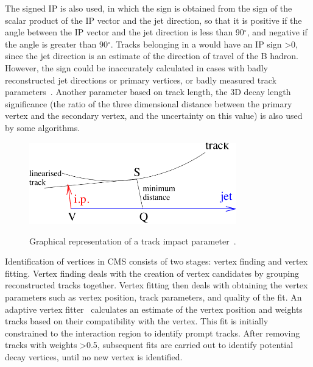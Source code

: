 The signed IP is also used, in which the sign is obtained from the sign of the scalar product of the IP vector
and the jet direction, so that it is positive if the angle between the IP vector and the jet direction is less
than 90$^{\circ}$, and negative if the angle is greater than 90$^{\circ}$. Tracks belonging in a \bjet would
have an IP sign >0, since the jet direction is an estimate of the direction of travel of the B hadron.
However, the sign could be inaccurately calculated in cases with badly reconstructed jet directions or primary
vertices, or badly measured track parameters~\cite{CMS-AN-2005-041}. Another parameter based on track length,
the 3D decay length significance (the ratio of the three dimensional distance between the primary vertex and
the secondary vertex, and the uncertainty on this value) is also used by some \btagging algorithms.

\begin{figure}[hbtp]
   \centering
     \includegraphics[width=0.8\textwidth]{Chapters/04_Analysis/04a_BTags/Images/impact_parameter}\\
     \caption[Graphical representation of a track impact parameter.]{Graphical representation of a track
     impact parameter~\cite{CMS-PAS-BTV-09-001}.}
     \label{fig:impact_parameter}
\end{figure}

Identification of vertices in CMS consists of two stages: vertex finding and vertex fitting. Vertex finding
deals with the creation of vertex candidates by grouping reconstructed tracks together. Vertex fitting then
deals with obtaining the vertex parameters such as vertex position, track parameters, and quality of the fit.
An adaptive vertex fitter~\cite{0954-3899-34-12-N01} calculates an estimate of the vertex position and weights
tracks based on their compatibility with the vertex. This fit is initially constrained to the interaction
region to identify prompt tracks. After removing tracks with weights >0.5, subsequent fits are carried out to
identify potential decay vertices, until no new vertex is identified.

